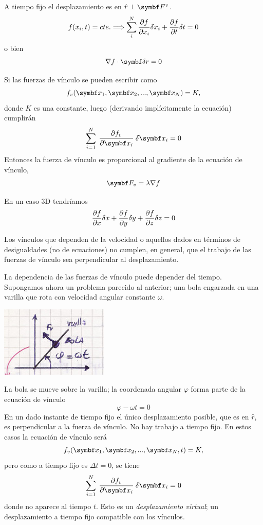\documentclass[10pt,oneside]{CBFT_book}
\begin{document}
A tiempo fijo el desplazamiento es en $\hat{r} \perp \vb{F}^v$.
\[
	f(x_i,t) = cte. \Longrightarrow \sum_i^N \frac{\partial^{\hspace{-0.05em}} {f}}{\partial {x_i}^{\hspace{-0.05em}}} \delta x_i + \frac{\partial^{\hspace{-0.05em}} {f}}{\partial {t}^{\hspace{-0.05em}}} \delta t = 0 
\]
o bien
\[
	\nabla f \cdot \vb{\delta r} = 0
\]

Si las fuerzas de vínculo se pueden escribir como 
\[
	f_v(\vb{x}_1, \vb{x}_2, ..., \vb{x}_N ) = K,
\]
donde $K$ es una constante, luego (derivando implícitamente la ecuación) cumplirán
\[
	\sum_{i=1}^N \: \dpar{f_v}{\vb{x}_i}\:\delta{\vb{x}_i} = 0
\]
Entonces la fuerza de vínculo es proporcional al gradiente de la ecuación de vínculo,
\[
	\vb{F}_v = \lambda \nabla f
\]

En un caso 3D tendríamos
\[
	\frac{\partial^{\hspace{-0.05em}} {f}}{\partial {x}^{\hspace{-0.05em}}}\delta x + \frac{\partial^{\hspace{-0.05em}} {f}}{\partial {y}^{\hspace{-0.05em}}}\delta y + \frac{\partial^{\hspace{-0.05em}} {f}}{\partial {z}^{\hspace{-0.05em}}}\delta z = 0
\]

Los vínculos que dependen de la velocidad o aquellos dados en términos de desigualdades (no de ecuaciones) no cumplen,
en general, que el trabajo de las fuerzas de vínculo sea perpendicular al desplazamiento.

La dependencia de las fuerzas de vínculo puede depender del tiempo. Supongamos ahora un problema parecido al anterior; 
una bola engarzada en una varilla que rota con velocidad angular constante $\omega$.

\includegraphics[scale=0.4]{images/fig_mc_bola_varilla_rotante.jpg}

La bola se mueve sobre la varilla; la coordenada angular $\varphi$ forma parte de la ecuación de vínculo
\[
	\varphi - \omega t = 0
\]
En un dado instante de tiempo fijo el único desplazamiento posible, que es en $\hat{r}$, es perpendicular a la fuerza 
de vínculo. No hay trabajo a tiempo fijo.
En estos casos la ecuación de vínculo será
\[
	f_v(\vb{x}_1, \vb{x}_2, ..., \vb{x}_N, t ) = K,
\]
pero como a tiempo fijo es $\Delta t=0$, se tiene 
\[
	\sum_{i=1}^N \: \dpar{f_v}{\vb{x}_i}\:\delta{\vb{x}_i} = 0
\]
donde no aparece al tiempo $t$.
Esto es un {\it desplazamiento virtual}; un desplazamiento a tiempo fijo compatible con los vínculos.
\end{document}
